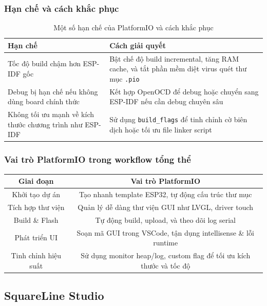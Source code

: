 \subsubsection{Hạn chế và cách khắc phục}

\begin{table}[H]
\centering
\begin{tabularx}{\textwidth}{|>{\raggedright\arraybackslash}X|>{\raggedright\arraybackslash}X|}
\hline
\textbf{Hạn chế} & \textbf{Cách giải quyết} \\
\hline
Tốc độ build chậm hơn ESP-IDF gốc & Bật chế độ build incremental, tăng RAM cache, và tắt phần mềm diệt virus quét thư mục \texttt{.pio} \\
\hline
Debug bị hạn chế nếu không dùng board chính thức & Kết hợp OpenOCD để debug hoặc chuyển sang ESP-IDF nếu cần debug chuyên sâu \\
\hline
Không tối ưu mạnh về kích thước chương trình như ESP-IDF & Sử dụng \texttt{build\_flags} để tinh chỉnh cờ biên dịch hoặc tối ưu file linker script \\
\hline
\end{tabularx}
\caption{Một số hạn chế của PlatformIO và cách khắc phục}
\end{table}

\subsubsection{Vai trò PlatformIO trong workflow tổng thể}
\begin{tabular}{|c|c|}
\hline
\textbf{Giai đoạn} & \textbf{Vai trò PlatformIO} \\
\hline
Khởi tạo dự án & Tạo nhanh template ESP32, tự động cấu trúc thư mục \\
\hline
Tích hợp thư viện & Quản lý dễ dàng thư viện GUI như LVGL, driver touch \\
\hline
Build \& Flash & Tự động build, upload, và theo dõi log serial \\
\hline
Phát triển UI & Soạn mã GUI trong VSCode, tận dụng intellisense \& lỗi runtime \\
\hline
Tinh chỉnh hiệu suất & Sử dụng monitor heap/log, custom flag để tối ưu kích thước và tốc độ \\
\hline
\end{tabular}
\subsection{SquareLine Studio}

